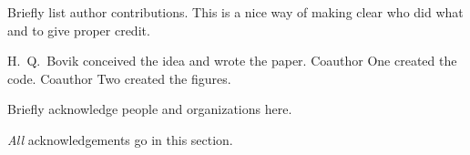 \documentclass{uai2021} %
\begin{document}
\begin{contributions} %
    Briefly list author contributions.
    This is a nice way of making clear who did what and to give proper credit.

    H.~Q.~Bovik conceived the idea and wrote the paper.
    Coauthor One created the code.
    Coauthor Two created the figures.
\end{contributions}

\begin{acknowledgements} %
    Briefly acknowledge people and organizations here.

    \emph{All} acknowledgements go in this section.
\end{acknowledgements}



\appendix
\end{document}
